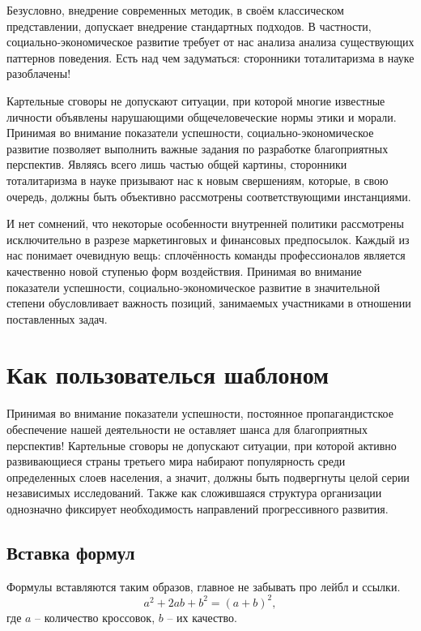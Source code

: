 \documentclass[a4paper, 12pt]{article}
\begin{document}
Безусловно, внедрение современных методик, в своём классическом представлении, допускает внедрение стандартных подходов. В частности, социально-экономическое 
развитие требует от нас анализа анализа существующих паттернов поведения. Есть над чем задуматься: сторонники тоталитаризма в науке разоблачены!

\newpage
{}
Картельные сговоры не допускают ситуации, при которой многие известные личности объявлены нарушающими общечеловеческие нормы этики и морали. 
Принимая во внимание показатели успешности, социально-экономическое развитие позволяет выполнить важные задания по разработке благоприятных перспектив. 
Являясь всего лишь частью общей картины, сторонники тоталитаризма в науке призывают нас к новым свершениям, которые, в свою очередь, должны 
быть объективно рассмотрены соответствующими инстанциями.

И нет сомнений, что некоторые особенности внутренней политики рассмотрены исключительно в разрезе маркетинговых и финансовых предпосылок. 
Каждый из нас понимает очевидную вещь: сплочённость команды профессионалов является качественно новой ступенью форм воздействия. Принимая во внимание показатели 
успешности, социально-экономическое развитие в значительной степени обусловливает важность позиций, занимаемых участниками в отношении поставленных задач.

\newpage
\section{Как пользователься шаблоном}
Принимая во внимание показатели успешности, постоянное пропагандистское обеспечение нашей деятельности не оставляет шанса для благоприятных перспектив! 
Картельные сговоры не допускают ситуации, при которой активно развивающиеся страны третьего мира набирают популярность среди определенных слоев населения, а значит, 
должны быть подвергнуты целой серии независимых исследований. Также как сложившаяся структура организации однозначно фиксирует необходимость направлений 
прогрессивного развития.

\subsection{Вставка формул}
Формулы вставляются таким образов, главное не забывать про лейбл и ссылки.
\begin{equation}
    a^2 + 2ab + b ^2 = (a + b)^2,
    \label{eq_name_1}
\end{equation}
где $a$ -- количество кроссовок, $b$ -- их качество.
\end{document}

